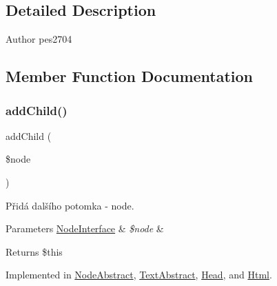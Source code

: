 \subsection{Detailed Description}
\begin{DoxyAuthor}{Author}
pes2704 
\end{DoxyAuthor}


\subsection{Member Function Documentation}
\mbox{\label{interface_pes_1_1_dom_1_1_node_1_1_node_interface_a1d59c3782ba90a94f31ee6c58d86e9fc}} 
\subsubsection{\texorpdfstring{add\+Child()}{addChild()}}
{\footnotesize\ttfamily add\+Child (\begin{DoxyParamCaption}\item[{\mbox{\hyperlink{interface_pes_1_1_dom_1_1_node_1_1_node_interface}{Node\+Interface}}}]{\$node }\end{DoxyParamCaption})}

Přidá dalšího potomka -\/ node.


\begin{DoxyParams}[1]{Parameters}
\mbox{\hyperlink{interface_pes_1_1_dom_1_1_node_1_1_node_interface}{Node\+Interface}} & {\em \$node} & \\
\hline
\end{DoxyParams}
\begin{DoxyReturn}{Returns}
\$this 
\end{DoxyReturn}


Implemented in \mbox{\hyperlink{class_pes_1_1_dom_1_1_node_1_1_node_abstract_a1d59c3782ba90a94f31ee6c58d86e9fc}{Node\+Abstract}}, \mbox{\hyperlink{class_pes_1_1_dom_1_1_node_1_1_text_1_1_text_abstract_ad351929e79a37854d087f8c02eda0ed6}{Text\+Abstract}}, \mbox{\hyperlink{class_pes_1_1_dom_1_1_node_1_1_tag_1_1_head_a1d59c3782ba90a94f31ee6c58d86e9fc}{Head}}, and \mbox{\hyperlink{class_pes_1_1_dom_1_1_node_1_1_tag_1_1_html_a1d59c3782ba90a94f31ee6c58d86e9fc}{Html}}.

